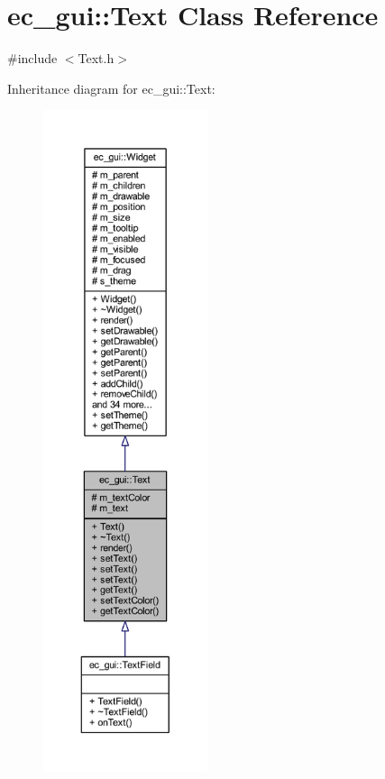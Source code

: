 \hypertarget{classec__gui_1_1_text}{}\section{ec\+\_\+gui\+:\+:Text Class Reference}
\label{classec__gui_1_1_text}


{\ttfamily \#include $<$Text.\+h$>$}



Inheritance diagram for ec\+\_\+gui\+:\+:Text\+:\nopagebreak
\begin{figure}[H]
\begin{center}
\leavevmode
\includegraphics[height=550pt]{classec__gui_1_1_text__inherit__graph}
\end{center}
\end{figure}


